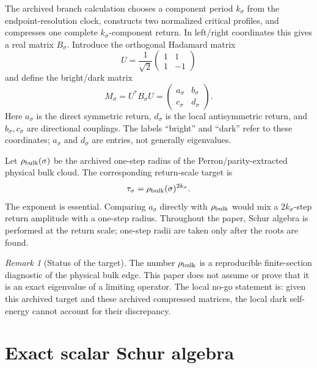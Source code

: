 \documentclass[11pt]{article}
\theoremstyle{definition}
\theoremstyle{remark}
\newtheorem{remark}[theorem]{Remark}
\begin{document}
The archived branch calculation chooses a component period $k_\sigma$ from
the endpoint-resolution clock, constructs two normalized critical profiles,
and compresses one complete $k_\sigma$-component return.  In left/right
coordinates this gives a real matrix $B_\sigma$.  Introduce the orthogonal
Hadamard matrix
\begin{equation}\label{eq:hadamard}
 U=\frac{1}{\sqrt2}
 \begin{pmatrix}1&1\\1&-1\end{pmatrix}
\end{equation}
and define the bright/dark matrix
\begin{equation}\label{eq:bright-dark-matrix}
 M_\sigma=U^*B_\sigma U
 =\begin{pmatrix}a_\sigma&b_\sigma\\
                  c_\sigma&d_\sigma\end{pmatrix}.
\end{equation}
Here $a_\sigma$ is the direct symmetric return, $d_\sigma$ is the local
antisymmetric return, and $b_\sigma,c_\sigma$ are directional couplings.
The labels ``bright'' and ``dark'' refer to these coordinates; $a_\sigma$
and $d_\sigma$ are entries, not generally eigenvalues.

Let $\rho_{\rm bulk}(\sigma)$ be the archived one-step radius of the
Perron/parity-extracted physical bulk cloud.  The corresponding return-scale
target is
\begin{equation}\label{eq:target-return}
 \tau_\sigma=\rho_{\rm bulk}(\sigma)^{2k_\sigma}.
\end{equation}
The exponent is essential.  Comparing $a_\sigma$ directly with
$\rho_{\rm bulk}$ would mix a $2k_\sigma$-step return amplitude with a
one-step radius.  Throughout the paper, Schur algebra is performed at the
return scale; one-step radii are taken only after the roots are found.

\begin{remark}[Status of the target]
The number $\rho_{\rm bulk}$ is a reproducible finite-section diagnostic of
the physical bulk edge.  This paper does not assume or prove that it is an
exact eigenvalue of a limiting operator.  The local no-go statement is:
given this archived target and these archived compressed matrices, the
local dark self-energy cannot account for their discrepancy.
\end{remark}

\section{Exact scalar Schur algebra}
\label{sec:scalar-schur}
\end{document}
